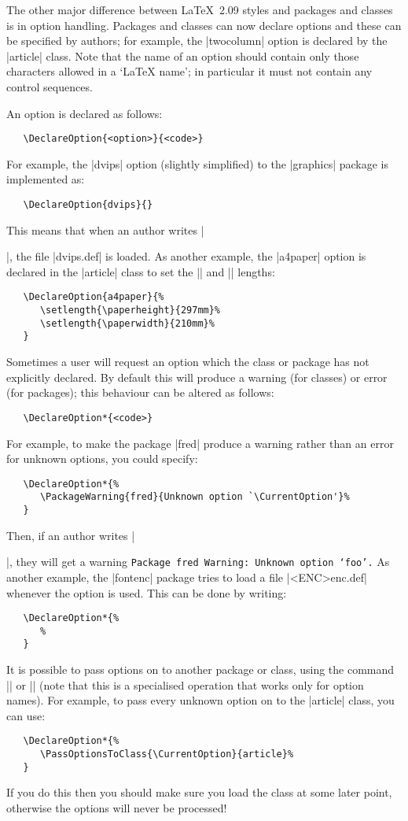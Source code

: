\documentclass[11pt]{ltxguide}[1995/11/28]
\begin{document}
The other major difference between \LaTeX~2.09 styles and \LaTeXe{}
packages and classes is in option handling.  Packages and classes can
now declare options and these can be specified by authors; for
example, the |twocolumn| option is declared by the |article| class.
Note that the name of an option should contain only those characters
allowed in a `\LaTeX{} name'; in particular it must not contain any
control sequences.

An option is declared as follows:
\begin{verbatim}
   \DeclareOption{<option>}{<code>}
\end{verbatim}
For example, the |dvips| option (slightly simplified)
to the |graphics| package is implemented as:
\begin{verbatim}
   \DeclareOption{dvips}{}
\end{verbatim}
This means that when an author writes |\usepackage[dvips]{graphics}|,
the file |dvips.def| is loaded.  As another example, the |a4paper|
option is declared in the |article| class to set the |\paperheight|
and |\paperwidth| lengths:
\begin{verbatim}
   \DeclareOption{a4paper}{%
      \setlength{\paperheight}{297mm}%
      \setlength{\paperwidth}{210mm}%
   }
\end{verbatim}
Sometimes a user will request an option which the class
or package has not explicitly declared.  By default this will produce
a warning (for classes) or error (for packages); this behaviour
can be altered as follows:
\begin{verbatim}
   \DeclareOption*{<code>}
\end{verbatim}
For example, to make the package |fred| produce a warning rather than
an error for unknown options, you could specify:
\begin{verbatim}
   \DeclareOption*{%
      \PackageWarning{fred}{Unknown option `\CurrentOption'}%
   }
\end{verbatim}
Then, if an author writes |\usepackage[foo]{fred}|, they will get a
warning \texttt{Package fred Warning: Unknown option `foo'.}  As
another example, the |fontenc| package tries to load a file
|<ENC>enc.def| whenever the  option is used.  This
can be done by writing:
\begin{verbatim}
   \DeclareOption*{%
      %
   }
\end{verbatim}
It is possible to pass options on to another package or class, using
the command |\PassOptionsToPackage| or |\PassOptionsToClass| (note
that this is a specialised operation that works only for option
names).  For example, to pass every unknown option on to the |article|
class, you can use:
\begin{verbatim}
   \DeclareOption*{%
      \PassOptionsToClass{\CurrentOption}{article}%
   }
\end{verbatim}
If you do this then you should make sure you load the class at some
later point, otherwise the options will never be processed!
\end{document}
